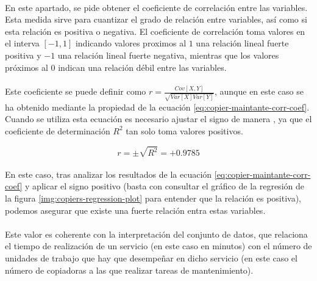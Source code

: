 \documentclass{article}
\begin{document}
        \paragraph{}
        En este apartado, se pide obtener el coeficiente de correlación entre las variables. Esta medida sirve para cuantizar el grado de relación entre variables, así como si esta relación es positiva o negativa. El coeficiente de correlación toma valores en el interva $[-1,1]$ indicando valores proximos al $1$ una relación lineal fuerte positiva y $-1$ una relación lineal fuerte negativa, mientras que los valores próximos al $0$ indican una relación débil entre las variables.

        \paragraph{}
        Este coeficiente se puede definir como $r=\frac{Cov[X,Y]}{\sqrt{Var[X]Var[Y]}}$, aunque en este caso se ha obtenido mediante la propiedad de la ecuación \eqref{eq:copier-maintante-corr-coef}. Cuando se utiliza esta ecuación es necesario ajustar el signo de manera , ya que el coeficiente de determinación $R^2$ tan solo toma valores positivos.

        \begin{equation}
          \label{eq:copier-maintante-corr-coef}
          r = \pm \sqrt{R^2} = + 0.9785
        \end{equation}

        \paragraph{}
        En este caso, tras analizar los resultados de la ecuación \eqref{eq:copier-maintante-corr-coef} y aplicar el signo positivo (basta con consultar el gráfico de la regresión de la figura \ref{img:copiers-regression-plot} para entender que la relación es positiva), podemos asegurar que existe una fuerte relación entra estas variables.

        \paragraph{}
        Este valor es coherente con la interpretación del conjunto de datos, que relaciona el tiempo de realización de un servicio (en este caso en minutos) con el número de unidades de trabajo que hay que desempeñar en dicho servicio (en este caso el número de copiadoras a las que realizar tareas de mantenimiento).
\end{document}
